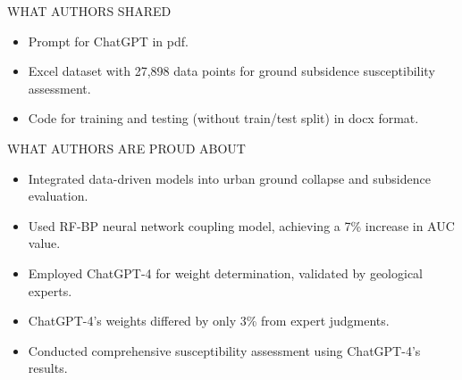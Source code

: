 \documentclass[11pt, aspectratio=169]{beamer}
\begin{document}
\begin{frame}{\MakeUppercase{What authors shared}}

\begin{itemize}
    \item Prompt for ChatGPT in pdf.
    \item Excel dataset with 27,898 data points for ground subsidence susceptibility assessment.
    \item Code for training and testing (without train/test split) in docx format.
\end{itemize}

\end{frame}

\begin{frame}{\MakeUppercase{What authors are proud about}}
\begin{itemize}
    \item Integrated data-driven models into urban ground collapse and subsidence evaluation.
    \item Used RF-BP neural network coupling model, achieving a 7\% increase in AUC value.
    \item Employed ChatGPT-4 for weight determination, validated by geological experts.
    \item ChatGPT-4's weights differed by only 3\% from expert judgments.
    \item Conducted comprehensive susceptibility assessment using ChatGPT-4's results.
\end{itemize}
\end{frame}


\end{document}
